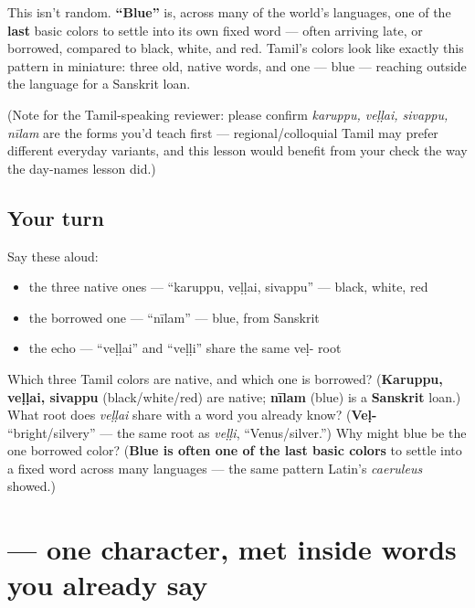 \begin{culture}
This isn't random. \textbf{\textquotedblleft{}Blue\textquotedblright{}} is, across many of the world's languages, one of the \textbf{last} basic colors to settle into its own fixed word — often arriving late, or borrowed, compared to black, white, and red. Tamil's colors look like exactly this pattern in miniature: three old, native words, and one — blue — reaching outside the language for a Sanskrit loan.

(Note for the Tamil-speaking reviewer: please confirm \emph{karuppu, veḷḷai, sivappu, nīlam} are the forms you'd teach first — regional/colloquial Tamil may prefer different everyday variants, and this lesson would benefit from your check the way the day-names lesson did.)
\end{culture}

\subsection*{Your turn}
Say these aloud:

\begin{itemize}
\raggedright
  \item the three native ones — \textquotedblleft{}karuppu, veḷḷai, sivappu\textquotedblright{} — black, white, red
  \item the borrowed one — \textquotedblleft{}nīlam\textquotedblright{} — blue, from Sanskrit
  \item the echo — \textquotedblleft{}veḷḷai\textquotedblright{} and \textquotedblleft{}veḷḷi\textquotedblright{} share the same veḷ- root
\end{itemize}

\begin{tcolorbox}[breakable,colback=teal!4,colframe=teal!35!black,title={Before you move on}]
Which three Tamil colors are native, and which one is borrowed? (\textbf{Karuppu, veḷḷai, sivappu} (black/white/red) are native; \textbf{nīlam} (blue) is a \textbf{Sanskrit} loan.) What root does \emph{veḷḷai} share with a word you already know? (\textbf{Veḷ-} \textquotedblleft{}bright/silvery\textquotedblright{} — the same root as \emph{veḷḷi}, \textquotedblleft{}Venus/silver.\textquotedblright{}) Why might blue be the one borrowed color? (\textbf{Blue is often one of the last basic colors} to settle into a fixed word across many languages — the same pattern Latin's \emph{caeruleus} showed.)
\end{tcolorbox}
\section[\texorpdfstring{\ta{ழ} (llla)}{ழ (llla)}]{ — one character, met inside words you already say}

